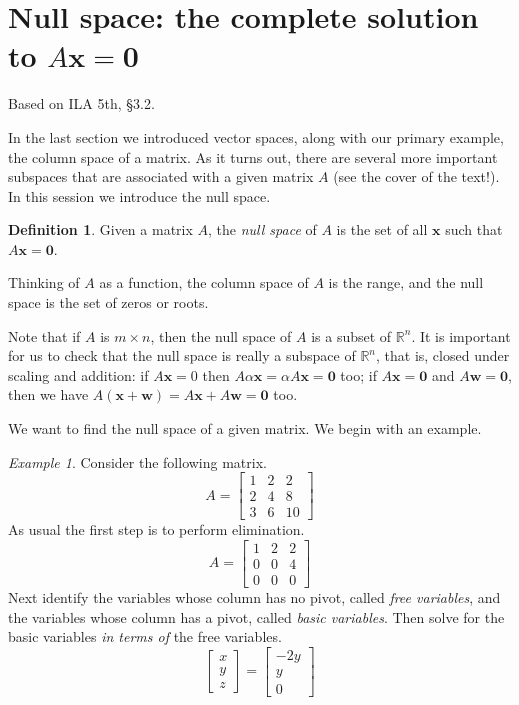 \documentclass[11pt,oneside]{amsbook}
\newcommand{\R}{\mathbb R}
\theoremstyle{definition}
\theoremstyle{plain}
\theoremstyle{definition}
\newtheorem{definition}[theorem]{Definition}
\theoremstyle{remark}
\newtheorem{example}[theorem]{Example}
\numberwithin{equation}{section}
\numberwithin{figure}{section}
\begin{document}
\newpage
\section{Null space: the complete solution to $A\mathbf{x}=\mathbf{0}$}

Based on ILA 5th, \S 3.2.

In the last section we introduced vector spaces, along with our primary example, the column space of a matrix. As it turns out, there are several more important subspaces that are associated with a given matrix $A$ (see the cover of the text!). In this session we introduce the null space.

\begin{definition}
  Given a matrix $A$, the \emph{null space} of $A$ is the set of all $\mathbf{x}$ such that $A\mathbf{x}=\mathbf{0}$.
\end{definition}

Thinking of $A$ as a function, the column space of $A$ is the range, and the null space is the set of zeros or roots.

Note that if $A$ is $m\times n$, then the null space of $A$ is a subset of $\R^n$. It is important for us to check that the null space is really a subspace of $\R^n$, that is, closed under scaling and addition: if $A\mathbf{x}=0$ then $A\alpha\mathbf{x}=\alpha A\mathbf{x}=\mathbf{0}$ too; if $A\mathbf{x}=\mathbf{0}$ and $A\mathbf{w}=\mathbf{0}$, then we have $A(\mathbf{x}+\mathbf{w})=A\mathbf{x}+A\mathbf{w}=\mathbf{0}$ too.

We want to find the null space of a given matrix. We begin with an example.

\begin{example}
  Consider the following matrix.
  \[A=\begin{bmatrix}1&2&2\\2&4&8\\3&6&10\end{bmatrix}
  \]
  As usual the first step is to perform elimination.
  \[A=\begin{bmatrix}1&2&2\\0&0&4\\0&0&0\end{bmatrix}
  \]
  Next identify the variables whose column has no pivot, called \emph{free variables}, and the variables whose column has a pivot, called \emph{basic variables}. Then solve for the basic variables \emph{in terms of} the free variables.
  \[\begin{bmatrix}x\\y\\z\end{bmatrix}
    =\begin{bmatrix}-2y\\y\\0\end{bmatrix}
  \]
\end{example}
\end{document}
